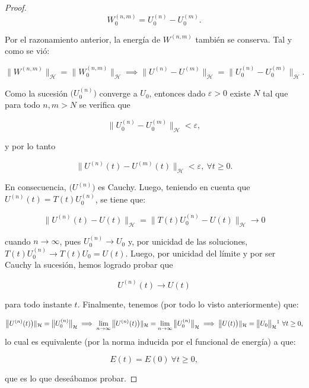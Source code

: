\begin{proof}
    \[W^{(n,m)}_0 = U^{(n)}_0 - U^{(m)}_0.\]

    Por el razonamiento anterior, la energía de $W^{(n,m)}$ también se conserva. Tal y como se vió:

    \[\big \lVert W^{(n,m)}\big \rVert_{\mathcal{H}} = \big \lVert W^{(n,m)}_0 \big \rVert_{\mathcal{H}} \implies \big \lVert U^{(n)} - U^{(m)} \big \rVert_{\mathcal{H}} = \big \lVert  U^{(n)}_0 - U^{(m)}_0 \big \rVert_{\mathcal{H}}.\]

    Como la sucesión $\big(U^{(n)}_0 \big)$ converge a $U_0$, entonces dado $\varepsilon > 0$ existe $N$ tal que para todo $n,m > N$ se verifica que

    \[\big \lVert  U^{(n)}_0 - U^{(m)}_0 \big \rVert_{\mathcal{H}} < \varepsilon,\]

    y por lo tanto

    \[\big \lVert U^{(n)}(t) - U^{(m)}(t) \big \rVert_{\mathcal{H}} < \varepsilon, \ \forall t \geq 0.\]

    En consecuencia, $\big( U^{(n)}\big)$ es Cauchy. Luego, teniendo en cuenta que $U^{(n)}(t) = T(t)U_0^{(n)}$, se tiene que:

    \[\big\lVert U^{(n)}(t) - U(t)\big\rVert_{\mathcal{H}} = \big\lVert T(t)U_0^{(n)} - U(t)\big\rVert_{\mathcal{H}} \rightarrow 0\]

    cuando $n \rightarrow \infty$, pues $U_0^{(n)} \rightarrow U_0$ y, por unicidad de las soluciones, $T(t)U_0^{(n)} \rightarrow T(t)U_0 = U(t)$. Luego, por unicidad del límite y por ser Cauchy la sucesión, hemos logrado probar que

    \[U^{(n)}(t) \rightarrow U(t)\]
    
    para todo instante $t$. Finalmente, tenemos (por todo lo visto anteriormente) que:

    \[\big\lVert U^{(n)}(t)\big)\rVert_{\mathcal{H}} = \big\lVert U^{(n)}_0\big\rVert_{\mathcal{H}} \implies \lim_{n\rightarrow \infty}\big\lVert U^{(n)}(t)\big)\rVert_{\mathcal{H}} = \lim_{n\rightarrow \infty}\big\lVert U^{(n)}_0\big\rVert_{\mathcal{H}} \implies \big\lVert U(t)\big)\rVert_{\mathcal{H}} = \big\lVert U_0\big\rVert_{\mathcal{H}}\footnotemark \ \forall t \geq 0,\]
    lo cual es equivalente (por la norma inducida por el funcional de energía) a que:

    \[E(t) = E(0) \ \forall t \geq 0,\]

    que es lo que deseábamos probar.
\end{proof}

